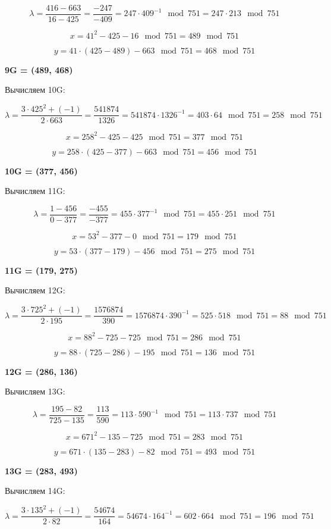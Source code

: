 \[
\lambda = \frac{416-663}{16-425} = \frac{-247}{-409} = 247 \cdot 409^{-1}\mod{751} = 247 \cdot 213\mod{751}
\]


\[
x = 41^2 - 425 - 16 \mod{751} = 489\mod{751}
\]


\[
y = 41 \cdot (425 - 489) - 663\mod{751} = 468\mod{751}
\]

\textbf{9G = (489, 468)}

Вычисляем 10G:

\[
\lambda = \frac{ 3 \cdot 425^2 + (-1) }{2 \cdot 663} = \frac{541874}{1326} = 541874 \cdot 1326^{-1} = 403 \cdot 64\mod{751} = 258\mod{751}
\]


\[
x = 258^2 - 425 - 425 \mod{751} = 377\mod{751}
\]


\[
y = 258 \cdot (425 - 377) - 663\mod{751} = 456\mod{751}
\]

\textbf{10G = (377, 456)}

Вычисляем 11G:

\[
\lambda = \frac{1-456}{0-377} = \frac{-455}{-377} = 455 \cdot 377^{-1}\mod{751} = 455 \cdot 251\mod{751}
\]


\[
x = 53^2 - 377 - 0 \mod{751} = 179\mod{751}
\]


\[
y = 53 \cdot (377 - 179) - 456\mod{751} = 275\mod{751}
\]

\textbf{11G = (179, 275)}

Вычисляем 12G:

\[
\lambda = \frac{ 3 \cdot 725^2 + (-1) }{2 \cdot 195} = \frac{1576874}{390} = 1576874 \cdot 390^{-1} = 525 \cdot 518\mod{751} = 88\mod{751}
\]


\[
x = 88^2 - 725 - 725 \mod{751} = 286\mod{751}
\]


\[
y = 88 \cdot (725 - 286) - 195\mod{751} = 136\mod{751}
\]

\textbf{12G = (286, 136)}

Вычисляем 13G:

\[
\lambda = \frac{195-82}{725-135} = \frac{113}{590} = 113 \cdot 590^{-1}\mod{751} = 113 \cdot 737\mod{751}
\]


\[
x = 671^2 - 135 - 725 \mod{751} = 283\mod{751}
\]


\[
y = 671 \cdot (135 - 283) - 82\mod{751} = 493\mod{751}
\]

\textbf{13G = (283, 493)}

Вычисляем 14G:

\[
\lambda = \frac{ 3 \cdot 135^2 + (-1) }{2 \cdot 82} = \frac{54674}{164} = 54674 \cdot 164^{-1} = 602 \cdot 664\mod{751} = 196\mod{751}
\]


